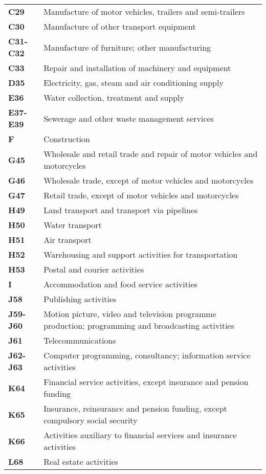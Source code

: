 \documentclass[11pt,a4paper]{article}
\begin{document}
\begin{table}[!h]
\begin{tabular}{ll}
\textbf{C29} &{Manufacture of motor vehicles, trailers and semi-trailers}\\
\textbf{C30} &{Manufacture of other transport equipment}\\
\textbf{C31-C32} &{Manufacture of furniture; other manufacturing}\\
\textbf{C33} &{Repair and installation of machinery and equipment}\\
\textbf{D35} &{Electricity, gas, steam and air conditioning supply}\\
\textbf{E36} &{Water collection, treatment and supply}\\
\textbf{E37-E39} &{Sewerage and other waste management services}\\
\textbf{F} &{Construction}\\
\textbf{G45} &{Wholesale and retail trade and repair of motor vehicles and motorcycles}\\
\textbf{G46} &{Wholesale trade, except of motor vehicles and motorcycles}\\
\textbf{G47} &{Retail trade, except of motor vehicles and motorcycles}\\
\textbf{H49} &{Land transport and transport via pipelines}\\
\textbf{H50} &{Water transport}\\
\textbf{H51} &{Air transport}\\
\textbf{H52} &{Warehousing and support activities for transportation}\\
\textbf{H53} &{Postal and courier activities}\\
\textbf{I} &{Accommodation and food service activities}\\
\textbf{J58} &{Publishing activities}\\
\textbf{J59-J60} &{Motion picture, video and television programme production; programming and broadcasting activities}\\
\textbf{J61} &{Telecommunications}\\
\textbf{J62-J63} &{Computer programming, consultancy; information service activities}\\
\textbf{K64} &{Financial service activities, except insurance and pension funding}\\
\textbf{K65} &{Insurance, reinsurance and pension funding, except compulsory social security}\\
\textbf{K66} &{Activities auxiliary to financial services and insurance activities}\\
\textbf{L68} &{Real estate activities}\\

\end{tabular}
\end{table}
\end{document}
